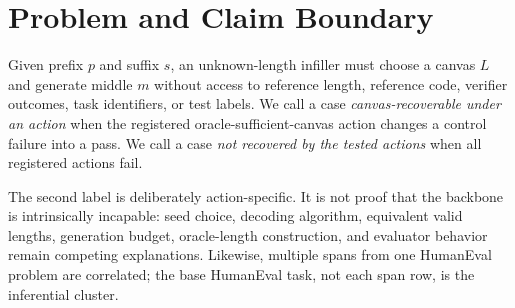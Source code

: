 \section{Problem and Claim Boundary}
Given prefix $p$ and suffix $s$, an unknown-length infiller must choose a canvas $L$ and generate middle $m$ without access to reference length, reference code, verifier outcomes, task identifiers, or test labels. We call a case \emph{canvas-recoverable under an action} when the registered oracle-sufficient-canvas action changes a control failure into a pass. We call a case \emph{not recovered by the tested actions} when all registered actions fail.

The second label is deliberately action-specific. It is not proof that the backbone is intrinsically incapable: seed choice, decoding algorithm, equivalent valid lengths, generation budget, oracle-length construction, and evaluator behavior remain competing explanations. Likewise, multiple spans from one HumanEval problem are correlated; the base HumanEval task, not each span row, is the inferential cluster.
